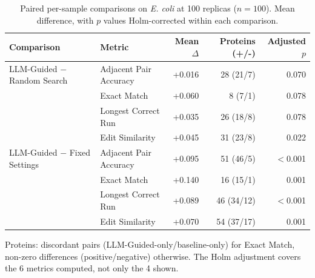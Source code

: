 \begin{table}[!tb]
  \centering
  \caption{Paired per-sample comparisons on \textnormal{\textnormal{\textit{E. coli}}} at 100 replicas ($n=100$). Mean difference, with $p$ values Holm-corrected within each comparison.}
  \label{tab:paired_tests_ecoli_r100}
  \begin{tabular}{llrrr}
    \toprule
    Comparison & Metric & Mean $\Delta$ & Proteins (+/-) & Adjusted $p$ \\
    \midrule
    LLM-Guided $-$ Random Search & Adjacent Pair Accuracy & +0.016 & 28 (21/7) & 0.070 \\
     & Exact Match & +0.060 & 8 (7/1) & 0.078 \\
     & Longest Correct Run & +0.035 & 26 (18/8) & 0.078 \\
     & Edit Similarity & +0.045 & 31 (23/8) & 0.022 \\
    \midrule
    LLM-Guided $-$ Fixed Settings & Adjacent Pair Accuracy & +0.095 & 51 (46/5) & $<$0.001 \\
     & Exact Match & +0.140 & 16 (15/1) & 0.001 \\
     & Longest Correct Run & +0.089 & 46 (34/12) & $<$0.001 \\
     & Edit Similarity & +0.070 & 54 (37/17) & 0.001 \\
    \bottomrule
  \end{tabular}
  \par\smallskip\footnotesize{Proteins: discordant pairs (LLM-Guided-only/baseline-only) for Exact Match, non-zero differences (positive/negative) otherwise. The Holm adjustment covers the 6 metrics computed, not only the 4 shown.}
\end{table}
